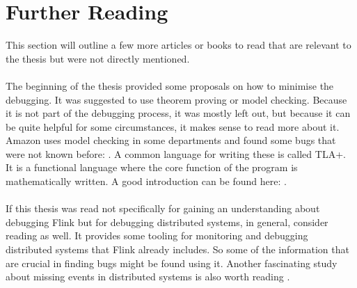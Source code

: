 \section{Further Reading}
This section will outline a few more articles or books to read that are relevant to the thesis but were not directly mentioned.

\paragraph{} The beginning of the thesis provided some proposals on how to minimise the debugging. It was suggested to use theorem proving or model checking. Because it is not part of the debugging process, it was mostly left out, but because it can be quite helpful for some circumstances, it makes sense to read more about it. Amazon uses model checking in some departments and found some bugs that were not known before: \cite{Newcombe:2015:AWS:2749359.2699417}.
A common language for writing these is called TLA+. It is a functional language where the core function of the program is mathematically written. A good introduction can be found here: \cite{Lamport:2002:SST:579617}.

\paragraph{} If this thesis was read not specifically for gaining an understanding about debugging Flink but for debugging distributed systems, in general, consider reading \cite{Olston:2011:IGF:1989323.1989459} as well. It provides some tooling for monitoring and debugging distributed systems that Flink already includes. So some of the information that are crucial in finding bugs might be found using it. Another fascinating study about missing events in distributed systems is also worth reading \cite{Wu:2014:DME:2740070.2626335}.
